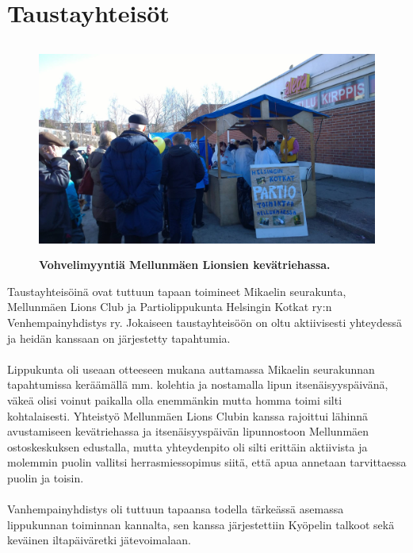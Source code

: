 \section{Taustayhteisöt}
\begin{figure}[htb]
	\begin{center}
		\includegraphics[height=7cm]{kuvat/lettukestit.jpg}
	\end{center}
	\captionsetup{labelformat=empty}
	\caption{\textbf{Vohvelimyyntiä Mellunmäen Lionsien kevätriehassa.}}
\end{figure}

Taustayhteisöinä ovat tuttuun tapaan toimineet Mikaelin seurakunta, Mellunmäen Lions Club ja Partiolippukunta Helsingin Kotkat ry:n Venhempainyhdistys ry. Jokaiseen taustayhteisöön on oltu aktiivisesti yhteydessä ja heidän kanssaan on järjestetty tapahtumia.\\
\\Lippukunta oli useaan otteeseen mukana auttamassa Mikaelin seurakunnan tapahtumissa keräämällä mm. kolehtia ja nostamalla lipun itsenäisyyspäivänä, väkeä olisi voinut paikalla olla enemmänkin mutta homma toimi silti kohtalaisesti. Yhteistyö Mellunmäen Lions Clubin kanssa rajoittui lähinnä avustamiseen kevätriehassa ja itsenäisyyspäivän lipunnostoon Mellunmäen ostoskeskuksen edustalla, mutta yhteydenpito oli silti erittäin aktiivista ja molemmin puolin vallitsi herrasmiessopimus siitä, että apua annetaan tarvittaessa puolin ja toisin.\\
\\Vanhempainyhdistys oli tuttuun tapaansa todella tärkeässä asemassa lippukunnan toiminnan kannalta, sen kanssa järjestettiin Kyöpelin talkoot sekä keväinen iltapäiväretki jätevoimalaan. 


